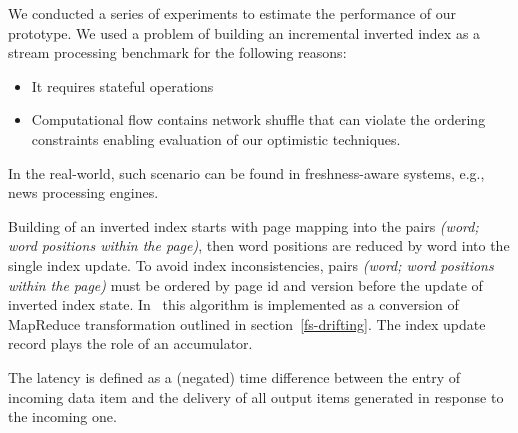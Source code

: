 
\label{fs-experiments-section}

We conducted a  series of experiments to estimate the performance of our  prototype. 
We used a problem of building an incremental inverted index as a stream processing benchmark  for the following reasons:

\begin{itemize}
    \item It requires stateful operations
    \item Computational flow contains network shuffle that can violate the ordering constraints %
    enabling evaluation of our optimistic techniques.
\end{itemize}

In the real-world, such scenario can be found in freshness-aware systems, e.g., news processing engines.

Building of an inverted index %
starts with page mapping into the pairs {\it (word; word positions within the page)}, then  word positions are reduced by word into the single index update. 
%
To avoid index inconsistencies, pairs {\it (word; word positions within the page)} must be ordered by page id and version before the update of inverted index state. 
In \FlameStream\ this algorithm is implemented as a conversion of MapReduce transformation 
outlined in  section~\ref{fs-drifting}.
The index update record plays the role of an accumulator. 

The latency is defined as a (negated) time difference between the entry of incoming data item and the delivery of all output items generated in response to the incoming one.


